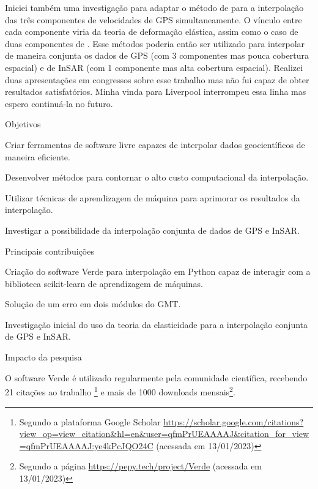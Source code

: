 \documentclass[10pt,a4paper,oneside]{book}
\begin{document}
Iniciei também uma investigação para adaptar o método de \citet{Sandwell2016}
para a interpolação das três componentes de velocidades de GPS simultaneamente.
O vínculo entre cada componente viria da teoria de deformação elástica, assim
como o caso de duas componentes de \citet{Sandwell2016}.
Esse métodos poderia então ser utilizado para interpolar de maneira conjunta
os dados de GPS (com 3 componentes mas pouca cobertura espacial) e de InSAR
(com 1 componente mas alta cobertura espacial).
Realizei duas apresentações em congressos sobre esse trabalho mas não fui capaz
de obter resultados satisfatórios.
Minha vinda para Liverpool interrompeu essa linha mas espero continuá-la no
futuro.

\begin{fancyenum}{\faBullseye}{Objetivos}
  \item Criar ferramentas de software livre capazes de interpolar dados
    geocientíficos de maneira eficiente.
  \item Desenvolver métodos para contornar o alto custo computacional da
    interpolação.
  \item Utilizar técnicas de aprendizagem de máquina para aprimorar os
    resultados da interpolação.
  \item Investigar a possibilidade da interpolação conjunta de dados de GPS e
    InSAR.
\end{fancyenum}
\begin{fancyenum}{\faLightbulb}{Principais contribuições}
  \item Criação do software Verde para interpolação em Python capaz de
    interagir com a biblioteca scikit-learn de aprendizagem de máquinas.
  \item Solução de um erro em dois módulos do GMT.
  \item Investigação inicial do uso da teoria da elasticidade para a
    interpolação conjunta de GPS e InSAR.
\end{fancyenum}
\begin{fancyenum}{\faRocket}{Impacto da pesquisa}
  \item O software Verde é utilizado regularmente pela comunidade científica,
    recebendo 21 citações ao trabalho \citet{Uieda2018}\footnote{Segundo a plataforma Google Scholar \url{https://scholar.google.com/citations?view_op=view_citation&hl=en&user=qfmPrUEAAAAJ&citation_for_view=qfmPrUEAAAAJ:ye4kPcJQO24C} (acessada em 13/01/2023)}
    e mais de 1000 downloads mensais\footnote{Segundo a página
    \url{https://pepy.tech/project/Verde} (acessada em 13/01/2023)}.
\end{fancyenum}
\end{document}
